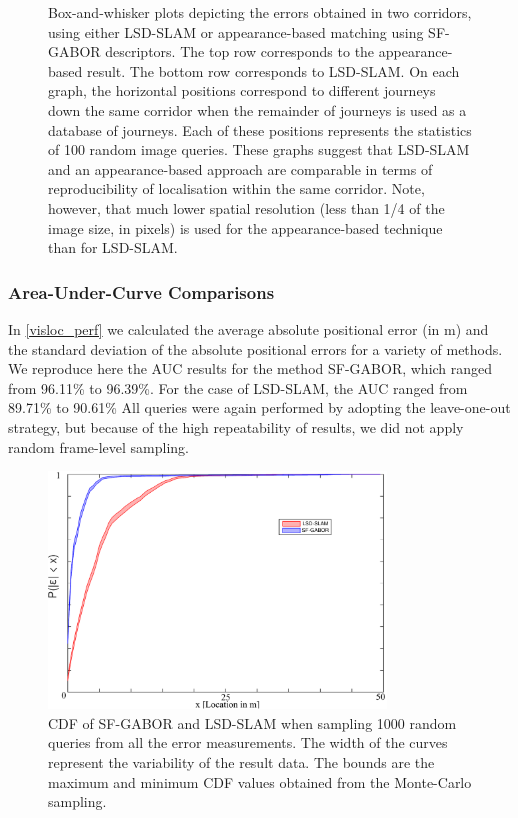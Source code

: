 \begin{figure}
\caption{Box-and-whisker plots depicting the errors obtained in two corridors, using either LSD-SLAM or appearance-based matching using SF-GABOR descriptors. The top row corresponds to the appearance-based result. The bottom row corresponds to LSD-SLAM. On each graph, the horizontal positions correspond to different journeys down the same corridor when the remainder of journeys is used as a database of journeys. Each of these positions represents the statistics of 100 random image queries. These graphs suggest that LSD-SLAM and an appearance-based approach are comparable in terms of reproducibility of localisation within the same corridor. Note, however, that much lower spatial resolution (less than 1/4 of the image size, in pixels) is used for the appearance-based technique than for LSD-SLAM.}
\label{fig:reprod}
\end{figure}

\subsubsection{Area-Under-Curve Comparisons}
In \ref{visloc_perf} we calculated the average absolute positional error (in m) and the standard deviation of the absolute positional errors for a variety of methods. We reproduce here the AUC results for the method SF-GABOR, which ranged from 96.11\% to 96.39\%. For the case of LSD-SLAM, the AUC ranged from 89.71\% to 90.61\% All queries were again performed by adopting the leave-one-out strategy, but because of the high repeatability of results, we did not apply random frame-level sampling.  


\begin{figure}[h]
\centering
\includegraphics[width=0.8\textwidth]{gfx/Chapter06/SF_GABORvsLSD_SLAM.pdf}
\caption{CDF of SF-GABOR and LSD-SLAM when sampling 1000 random queries from all the error measurements. The width of the curves represent the variability of the result data. The bounds are the maximum and minimum CDF values obtained from the Monte-Carlo sampling.}
\label{fig:cdf}
\end{figure}



